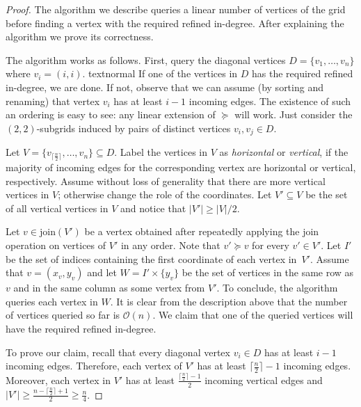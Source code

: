 \documentclass[runningheads,a4paper]{llncs}
\newcommand{\indegree}{refined in-degree\xspace}
\newcommand{\join}{\mbox{join}\xspace}
\begin{document}
\begin{proof}
The algorithm we describe queries a linear number of vertices of the grid before finding a vertex with the required \indegree. 
After explaining the algorithm we prove its correctness.
  
The algorithm works as follows. First, query the diagonal vertices $D = \{v_1,\ldots, v_n\}$ where $v_i = (i,i)$. textnormal
If one of the vertices in $D$ has the required \indegree, we are done. 
If not, observe that we can assume (by sorting and renaming) that vertex $v_i$ has at least $i-1$ incoming edges. 
The existence of such an ordering is easy to see: any linear extension of $\succeq$ will work. Just consider the $(2,2)$-subgrids induced by pairs of distinct vertices $v_i,v_j \in D$. 

Let $V = \{v_{\lceil \frac{n}{2} \rceil},\ldots,v_n\} \subseteq D$.
Label the vertices in $V$ as \emph{horizontal}  or \emph{vertical}, if the majority of incoming edges for the corresponding vertex are horizontal  or vertical, respectively. 
Assume without loss of generality that there are more vertical vertices in $V$; otherwise change the role of the coordinates. 
Let $V' \subseteq V$ be the set of all vertical vertices in $V$ and notice that $|V'| \geq |V|/2$.


Let $v \in \join(V')$ be a vertex obtained after repeatedly applying the \join operation on vertices of $V'$ in any order. 
Note that $v' \succeq v$ for every $v' \in V'$. Let $I'$ be the set of indices containing the first coordinate of each vertex in~$V'$. 
Assume that $v = (x_v, y_v)$ and let $W = I'\times \{y_v\}$ be the set of vertices in the same row as $v$ and in the same column as some vertex from $V'$.
To conclude, the algorithm queries each vertex in $W$.
It is clear from the description above that the number of vertices queried so far is $\mathcal{O}(n)$. 
We claim that one of the queried vertices will have the required \indegree.

To prove our claim, recall that every diagonal vertex $v_i \in D$ has at least $i - 1$ incoming edges.  
Therefore, each vertex of $V'$ has at least $\lceil \frac{n}{2} \rceil - 1$ incoming edges. 
Moreover, each vertex in $V'$ has at least $\frac{\lceil \frac{n}{2}\rceil-1}{2}$ incoming vertical edges and $|V'| \geq \frac{n-\lceil \frac{n}{2}\rceil + 1}{2} \geq \frac{n}{4}$. 


\end{proof}
\end{document}
